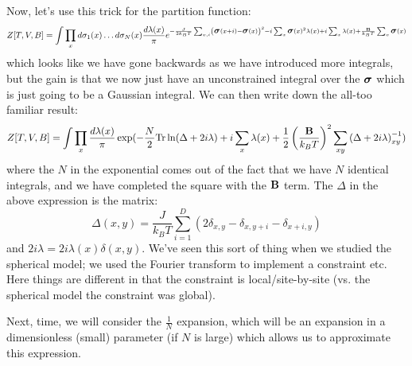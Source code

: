Now, let's use this trick for the partition function:
\begin{equation}
    Z[T, V, B] = \int \prod_x d\sigma_1(x) \ldots d\sigma_N(x) \frac{d\lambda(x)}{\pi}e^{-\frac{J}{2k_B T}\sum_{x, i}\left(\mbox{\boldmath$ \sigma $}(x + i) - \mbox{\boldmath$ \sigma $}(x)\right)^2 - i\sum_x \mbox{\boldmath$ \sigma $}(x)^2\lambda(x) + i\sum_x \lambda(x) + \frac{\mathbf{B}}{k_B T}\sum_x \mbox{\boldmath$ \sigma $}(x)}
\end{equation}
which looks like we have gone backwards as we have introduced more integrals, but the gain is that we now just have an unconstrained integral over the $\mbox{\boldmath$ \sigma $}$ which is just going to be a Gaussian integral. We can then write down the all-too familiar result:
\begin{equation}
    Z[T, V, B] = \int \prod_x \frac{d\lambda(x)}{\pi}\exp(-\frac{N}{2}\mathrm{Tr}\ln(\Delta + 2i\lambda) + i\sum_x \lambda(x) + \frac{1}{2}\left(\frac{\mathbf{B}}{k_B T}\right)^2\sum_{xy}\left(\Delta + 2i\lambda\right)^{-1}_{xy})
\end{equation}
where the $N$ in the exponential comes out of the fact that we have $N$ identical integrals, and we have completed the square with the $\mathbf{B}$ term. The $\Delta$ in the above expression is the matrix:
\begin{equation}
    \Delta(x, y) = \frac{J}{k_B T} \sum_{i=1}^D \left(2\delta_{x, y} - \delta_{x, y+i} - \delta_{x + i, y}\right)
\end{equation}
and $2i\lambda = 2i\lambda(x)\delta(x, y)$. We've seen this sort of thing when we studied the spherical model; we used the Fourier transform to implement a constraint etc. Here things are different in that the constraint is local/site-by-site (vs. the spherical model the constraint was global).

Next, time, we will consider the $\frac{1}{N}$ expansion, which will be an expansion in a dimensionless (small) parameter (if $N$ is large) which allows us to approximate this expression.